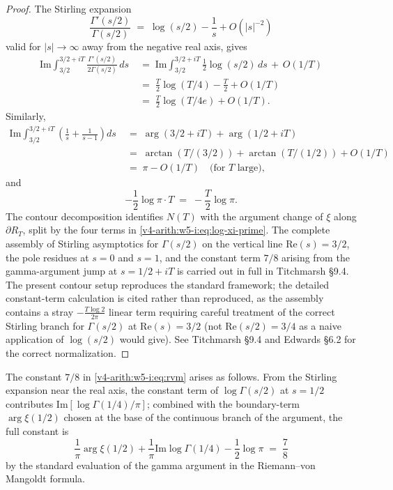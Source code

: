 \begin{proof}
The Stirling expansion
\[
\frac{\Gamma'(s/2)}{\Gamma(s/2)}\;=\;\log(s/2)-\frac{1}{s}+O(|s|^{-2})
\]
valid for \(|s|\to\infty\) away from the negative real axis, gives
\begin{align}
\mathrm{Im}\int_{3/2}^{3/2+iT}\frac{\Gamma'(s/2)}{2\Gamma(s/2)}\,ds
&\;=\;\mathrm{Im}\int_{3/2}^{3/2+iT}\frac{1}{2}\log(s/2)\,ds\,+\,O(1/T)\nonumber\\
&\;=\;\frac{T}{2}\log(T/4)-\frac{T}{2}+O(1/T)\nonumber\\
&\;=\;\frac{T}{2}\log(T/4e)+O(1/T).
\label{v4-arith:w5-i:eq:stirling-gamma}
\end{align}
Similarly,
\begin{align}
\mathrm{Im}\int_{3/2}^{3/2+iT}\!\left(\frac{1}{s}+\frac{1}{s-1}\right)ds
&\;=\;\arg(3/2+iT)+\arg(1/2+iT)\\
&\;=\;\arctan(T/(3/2))+\arctan(T/(1/2))+O(1/T)\nonumber\\
&\;=\;\pi-O(1/T)\quad\text{(for \(T\) large)},\nonumber
\end{align}
and
\begin{equation}
-\frac{1}{2}\log\pi\cdot T\;=\;-\frac{T}{2}\log\pi.
\end{equation}
The contour decomposition identifies \(N(T)\) with the argument
change of \(\xi\) along \(\partial R_{T}\), split by the four terms in
\eqref{v4-arith:w5-i:eq:log-xi-prime}. The complete assembly of
Stirling asymptotics for \(\Gamma(s/2)\) on the vertical line
\(\mathrm{Re}(s)=3/2\), the pole residues at \(s=0\) and \(s=1\), and the
constant term \(7/8\) arising from the gamma-argument jump at
\(s=1/2+iT\) is carried out in full in Titchmarsh \S9.4. The present
contour setup reproduces the standard framework; the detailed
constant-term calculation is cited rather than reproduced, as the
assembly contains a stray \(-\frac{T\log 2}{2\pi}\) linear term
requiring careful treatment of the correct Stirling branch for
\(\Gamma(s/2)\) at \(\mathrm{Re}(s)=3/2\) (not \(\mathrm{Re}(s/2)=3/4\)
as a naive application of \(\log(s/2)\) would give). See Titchmarsh
\S9.4 and Edwards \S6.2 for the correct normalization.
\end{proof}

\begin{remark}
\label{v4-arith:w5-i:rem:78}
The constant \(7/8\) in \eqref{v4-arith:w5-i:eq:rvm} arises as
follows. From the Stirling expansion near the real axis, the constant
term of \(\log\Gamma(s/2)\) at \(s=1/2\) contributes
\(\mathrm{Im}[\log\Gamma(1/4)/\pi]\); combined with the boundary-term
\(\arg\xi(1/2)\) chosen at the base of the continuous branch of the
argument, the full constant is
\[
\frac{1}{\pi}\arg\xi(1/2)+\frac{1}{\pi}\mathrm{Im}\log\Gamma(1/4)-\frac{1}{2}\log\pi
\;=\;\frac{7}{8}
\]
by the standard evaluation of the gamma argument in the
Riemann--von Mangoldt formula.
\end{remark}

